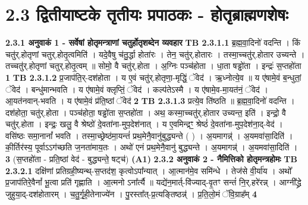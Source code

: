 \documentclass[17pt]{extarticle}
\begin{document}
     \section*{ 2.3     द्वितीयाष्टके तृतीयः प्रपाठकः - होतृब्राह्मणशेषः }
                \textbf{ 2.3.1    अनुवाकं   1 - सर्वेषां होतृमन्त्राणां चतुर्होतृशब्देन व्यवहार} \newline
                                \textbf{ TB 2.3.1.1} \newline
                  ब्र॒ह्म॒वा॒दिनो॑ वदन्ति । किं चतु॑र्.होतृणां चतुर्.होतृ॒त्वमिति॑ । यदे॒वैषु च॑तु॒र्द्धा होता॑रः । तेन॒ चतु॑र्.होतारः । तस्मा॒च्चतु॑र्.होतार उच्यन्ते । तच्चतु॑र्.होतृणां चतुर्.होतृ॒त्वम् ॥ सोमो॒ वै चतु॑र्.होता । अ॒ग्निः पञ्च॑होता । धा॒ता षड्ढो॑ता । इन्द्रः॑ स॒प्तहो॑ता \textbf{ 1} \newline
                  \newline
                                \textbf{ TB 2.3.1.2} \newline
                  प्र॒जाप॑ति॒र्-दश॑होता । य ए॒वं चतु॑र्.होतृणा॒-मृद्धिं॒ ॅवेद॑ । ऋ॒ध्नोत्ये॒व ॥ य ए॑षामे॒वं ब॒न्धुतां॒ ॅवेद॑ । बन्धु॑मान्भवति । य ए॑षामे॒वं क्लृप्तिं॒ ॅवेद॑ । कल्प॑तेऽस्मै । य ए॑षामे॒व-मा॒यत॑नं॒ ॅवेद॑ । आ॒यत॑नवान्-भवति । य ए॑षामे॒वं प्र॑ति॒ष्ठां ॅवेद॑ \textbf{ 2} \newline
                  \newline
                                \textbf{ TB 2.3.1.3} \newline
                  प्रत्ये॒व ति॑ष्ठति ॥ ब्र॒ह्म॒वा॒दिनो॑ वदन्ति । दश॑होता॒ चतु॑र्.होता । पञ्च॑होता॒ षड्ढो॑ता स॒प्तहो॑ता । अथ॒ कस्मा॒च्चतु॑र्.होतार उच्यन्त॒ इति॑ । इन्द्रो॒ वै चतु॑र्.होता । इन्द्रः॒ खलु॒ वै श्रेष्ठो॑ दे॒वता॑ना-मुप॒देश॑नात् । य ए॒वमिन्द्रꣳ॒॒ श्रेष्ठं॑ दे॒वता॑ना-मुप॒देश॑ना॒द्-वेद॑ । वसि॑ष्ठः समा॒नानां᳚ भवति । तस्मा॒च्छ्रेष्ठ॑मा॒यन्तं॑ प्रथ॒मेनै॒वानु॑बुद्ध्यन्ते ( ) । अ॒यमागन्न्॑ । अ॒यमवा॑सा॒दिति॑ । की॒र्तिर॑स्य॒ पूर्वाऽऽग॑च्छति ज॒नता॑माय॒तः । अथो॑ एनं प्रथ॒मेनै॒वानु॑ बुद्ध्यन्ते । अ॒यमागन्न्॑ । अ॒यमवा॑सा॒दिति॑ । \textbf{ 3} \newline
                  \newline
                                    (स॒प्तहो॑ता - प्रति॒ष्ठां वेद॑ - बुद्ध्यन्ते॒ षट्च॑) \textbf{(A1)} \newline \newline
                \textbf{ 2.3.2      अनुवाकं   2 - नैमित्तिको होतृमन्त्रहोमः} \newline
                                \textbf{ TB 2.3.2.1} \newline
                  दक्षि॑णां प्रतिग्रही॒ष्यन्थ्-स॒प्तद॑श॒ कृत्वोऽपा᳚न्यात् । आ॒त्मान॑मे॒व समि॑न्धे । तेज॑से वी॒र्या॑य । अथो᳚ प्र॒जाप॑तिरे॒वैनां᳚ भू॒त्वा प्रति॑ गृह्णाति । आ॒त्मनो ऽना᳚र्त्यै ॥ यद्ये॑न॒मार्त्-वि॑ज्याद्-वृ॒तꣳ सन्तं॑ नि॒र्.हरे॑रन्न् । आग्नी᳚द्ध्रे जुहुया॒द्-दश॑होतारम् । च॒तु॒र्गृ॒ही॒तेनाज्ये॑न । पु॒रस्ता᳚त्-प्र॒त्यङ्तिष्ठन्न्॑ । प्र॒ति॒लो॒मं ॅवि॒ग्राह᳚म् \textbf{ 4} \newline
\end{document}
